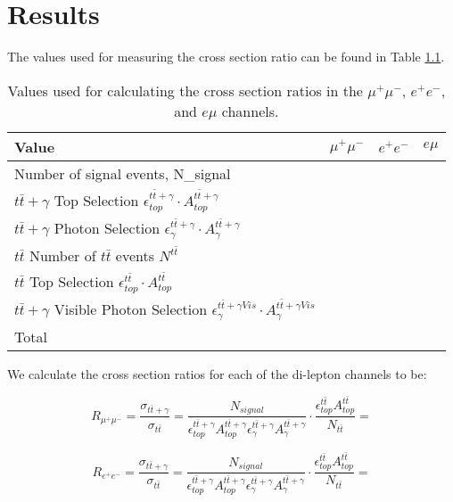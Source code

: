 \chapter{Results} \label{chap-Results}

The values used for measuring the cross section ratio can be found in Table \ref{tab-xsectvariables}.

\begin{table}[h!] \label{tab-xsectvariables}
\centering
\begin{tabular}{|l|c|c|c|}
\hline
	\textbf{Value} & $\mu^+\mu^-$ & $e^+e^-$ & $e\mu$ \\
\hline
	Number of signal events, N_{signal} & & & \\
	$t\bar{t}+\gamma$ Top Selection $\epsilon^{t\bar{t}+\gamma}_{top} \cdot A^{t\bar{t}+\gamma}_{top}$ & & & \\
	$t\bar{t}+\gamma$ Photon Selection $\epsilon^{t\bar{t}+\gamma}_{\gamma} \cdot A^{t\bar{t}+\gamma}_{\gamma}$ & & & \\
	$t\bar{t}$ Number of $t\bar{t}$ events $N^{t\bar{t}}$ & & & \\
	$t\bar{t}$ Top Selection $\epsilon^{t\bar{t}}_{top} \cdot A^{t\bar{t}}_{top}$ & & & \\
	$t\bar{t}+\gamma$ Visible Photon Selection $\epsilon^{t\bar{t}+\gamma Vis}_{\gamma} \cdot A^{t\bar{t}+\gamma Vis}_{\gamma}$ & & & \\
\hline
	Total & & & \\
\hline
\end{tabular} 
\caption{Values used for calculating the cross section ratios in the $\mu^+\mu^-$, $e^+e^-$, and $e\mu$ channels.}
\end{table}

We calculate the cross section ratios for each of the di-lepton channels to be:

\begin{equation}
	R_{\mu^+\mu^-} = \frac{\sigma_{t\bar{t}+\gamma}}{\sigma_{t\bar{t}}} = \frac{N_{signal}}{\epsilon^{t\bar{t}+\gamma}_{top} A^{t\bar{t}+\gamma}_{top} \epsilon^{t\bar{t}+\gamma}_{\gamma} A^{t\bar{t}+\gamma}_{\gamma}} \cdot \frac{\epsilon^{t\bar{t}}_{top} A^{t\bar{t}}_{top}}{N_{t\bar{t}}} = 
\end{equation}

\begin{equation}
	R_{e^+e^-} = \frac{\sigma_{t\bar{t}+\gamma}}{\sigma_{t\bar{t}}} = \frac{N_{signal}}{\epsilon^{t\bar{t}+\gamma}_{top} A^{t\bar{t}+\gamma}_{top} \epsilon^{t\bar{t}+\gamma}_{\gamma} A^{t\bar{t}+\gamma}_{\gamma}} \cdot \frac{\epsilon^{t\bar{t}}_{top} A^{t\bar{t}}_{top}}{N_{t\bar{t}}} = 
\end{equation}

